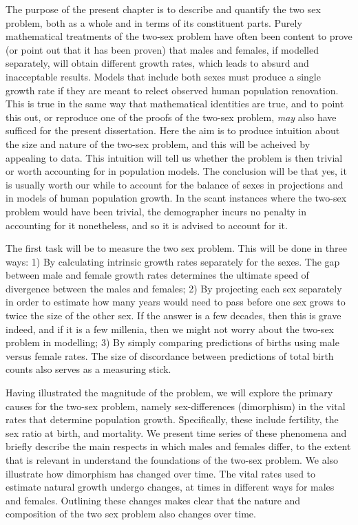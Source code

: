 \label{ch:Measuring}
The purpose of the present chapter is to describe and quantify the two sex
problem, both as a whole and in terms of its constituent parts. Purely
mathematical treatments of the two-sex problem have often been content to 
prove (or point out that it has been proven) that males and females,
if modelled separately, will obtain different growth rates, which leads to
absurd and inacceptable results. Models that include both sexes must produce a
single growth rate if they are meant to relect observed human population renovation. This is
true in the same way that mathematical identities are true, and to point this
out, or reproduce one of the proofs of the two-sex problem, \textit{may} also have sufficed for the
present dissertation. Here the aim is to produce
intuition about the size and nature of the two-sex problem, and this will be
acheived by appealing to data. This intuition will tell us whether the 
problem is then trivial or worth accounting for in
population models. The conclusion will be that yes, it is usually worth our
while to account for the balance of sexes in projections and in models of human
population growth. In the scant instances where the two-sex problem would have
been trivial, the demographer incurs no penalty in accounting for it
nonetheless, and so it is advised to account for it.

The first task will be to measure the two sex problem. This will be done in
three ways: 1) By calculating intrinsic growth rates separately for the sexes.
The gap between male and female growth rates determines the ultimate speed of
divergence between the males and females; 2) By projecting each sex separately
in order to estimate how many years would need to pass before one sex grows to
twice the size of the other sex. If the answer is a few decades, then this is
grave indeed, and if it is a few millenia, then we might not worry about the
two-sex problem in modelling; 3) By simply comparing predictions of births using
male versus female rates. The size of discordance between predictions of total
birth counts also serves as a measuring stick.

Having illustrated the magnitude of the problem, we will explore the primary
causes for the two-sex problem, namely sex-differences (dimorphism) in the vital rates
that determine population growth. Specifically, these include fertility, the sex
ratio at birth, and mortality. We present time series of these phenomena and
briefly describe the main respects in which males and females differ, to the
extent that is relevant in understand the foundations of the two-sex problem. We
also illustrate how dimorphism has changed over time. The vital rates
used to estimate natural growth undergo changes, at times in different ways for
males and females. Outlining these changes makes clear that the nature and
composition of the two sex problem also changes over time.

